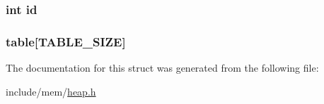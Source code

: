\subsubsection[{\texorpdfstring{id}{id}}]{\setlength{\rightskip}{0pt plus 5cm}int id}\hypertarget{structindex__table_a7441ef0865bcb3db9b8064dd7375c1ea}{}\label{structindex__table_a7441ef0865bcb3db9b8064dd7375c1ea}
\subsubsection[{\texorpdfstring{table}{table}}]{ table\mbox{[}{\bf T\+A\+B\+L\+E\+\_\+\+S\+I\+ZE}\mbox{]}}\hypertarget{structindex__table_ac79481e508bbe68d18d747f7af369986}{}\label{structindex__table_ac79481e508bbe68d18d747f7af369986}


The documentation for this struct was generated from the following file\+:\begin{DoxyCompactItemize}
\item 
include/mem/\hyperlink{heap_8h}{heap.\+h}\end{DoxyCompactItemize}
